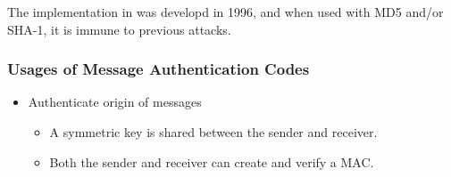 The implementation in  was developd in 1996, and when used with MD5 and/or SHA-1, it is immune to previous attacks.

\subsubsection{Usages of Message Authentication Codes}\label{subsubsec:MAC_Usages}
\begin{itemize}[noitemsep]
\item Authenticate origin of messages
  \begin{itemize}[noitemsep]
  \item A symmetric key is shared between the sender and receiver.
  \item Both the sender and receiver can create and verify a MAC.
  \end{itemize}
\end{itemize}

